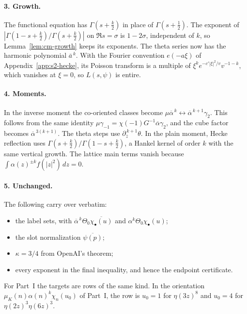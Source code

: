 \documentclass[11pt]{article}
\numberwithin{equation}{section}
\newcommand{\muk}{\mu_K}
\begin{document}
\paragraph{3. Growth.} The functional equation has $\Gamma(s+\frac k2)$ in place of $\Gamma(s+\frac12)$. The
exponent of $|\Gamma(1-s+\frac k2)/\Gamma(s+\frac k2)|$ on $\Re s=\sigma$ is $1-2\sigma$, independent of $k$, so
Lemma~\ref{lem:cm-growth} keeps its exponents. The theta series now has the harmonic polynomial
$\bar a^{\,k}$. With the Fourier convention $e(-a\xi)$ of Appendix~\ref{app:s2-hecke},
its Poisson transform is a multiple of $\xi^ke^{-c'|\xi|^2/v}v^{-1-k}$, which vanishes at $\xi=0$,
so $L(s,\psi)$ is entire.

\paragraph{4. Moments.} In the inverse moment the co-oriented classes become
$\mu\overline\alpha^{\,k}\leftrightarrow\overline\alpha^{\,k+1}\gamma_2$. This follows from the same identity
$\mu\gamma_{-1}=\chi(-1)G^{-1}\overline\alpha\gamma_2$, and the cube factor becomes $\overline\alpha^{\,3(k+1)}$. The theta steps
use $\partial_{\bar z}^{\,k+1}\theta$. In the plain moment, Hecke reflection uses
$\Gamma(s+\frac k2)/\Gamma(1-s+\frac k2)$, a Hankel kernel of order $k$ with the same vertical growth. The
lattice main terms vanish because $\int\alpha(z)^{\pm k}f(|z|^2)\,dz=0$.

\paragraph{5. Unchanged.} The following carry over verbatim:
\begin{itemize}
\item the label sets, with $\overline\alpha^{\,k}\Theta_0\overline{\chi_\bullet(u)}$ and $\alpha^k\Theta_0\chi_\bullet(u)$;
\item the slot normalization $\overline{\psi(p)}$;
\item $\kappa=3/4$ from OpenAI's theorem;
\item every exponent in the final inequality, and hence the endpoint certificate.
\end{itemize}
For Part~I the targets are rows of the same kind. In the orientation $\muk(n)\alpha(n)^k\chi_n(u_0)$ of
Part~I, the row is $u_0=1$ for $\eta(3z)^8$ and $u_0=4$ for $\eta(2z)^3\eta(6z)^3$.
\end{document}
